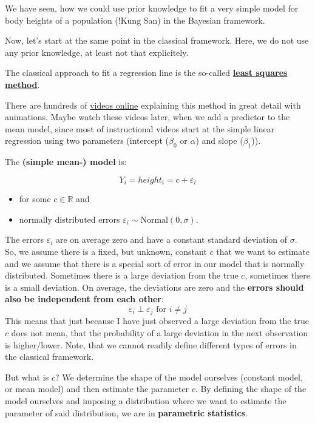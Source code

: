 \documentclass[
]{book}
\providecommand{\tightlist}{%
  \setlength{\itemsep}{0pt}\setlength{\parskip}{0pt}}
\begin{document}
We have seen, how we could use prior knowledge to fit a very simple model
for body heights of a population (!Kung San) in the Bayesian framework.

Now, let's start at the same point in the classical framework.
Here, we do not use any prior knowledge, at least not that explicitely.

The classical approach to fit a regression line is the so-called
\textbf{\href{https://en.wikipedia.org/wiki/Least_squares}{least squares method}}.

There are hundreds of \href{https://www.youtube.com/results?search_query=linear+regression}{videos online}
explaining this method in great detail
with animations. Maybe watch these videos later, when we add a predictor to the mean model,
since most of instructional videos start at the simple linear regression using
two parameters (intercept (\(\beta_0\) or \(\alpha\)) and slope (\(\beta_1\))).

The \textbf{(simple mean-) model} is:

\[ Y_i = height_i = c + \varepsilon_i \]

\begin{itemize}
\tightlist
\item
  for some \(c \in \mathbb{R}\) and
\item
  normally distributed errors \(\varepsilon_i \sim \text{Normal}(0, \sigma)\).
\end{itemize}

The errors \(\varepsilon_i\) are on average zero and have a constant standard deviation of \(\sigma\).
So, we assume there is a fixed, but unknown, constant \(c\) that we want to estimate and we
assume that there is a special sort of error in our model that is normally distributed.
Sometimes there is a large deviation from the true \(c\), sometimes there is a small deviation.
On average, the deviations are zero and the \textbf{errors should also be independent from each other}:
\[ \varepsilon_i \perp \varepsilon_j \text{ for } i \neq j\]
This means that just because I have just observed a large deviation from the true \(c\)
does not mean, that the probability of a large deviation in the next observation is higher/lower.
Note, that we cannot readily define different types of errors in the classical framework.

But what is \(c\)? We determine the shape of the model
ourselves (constant model, or mean model) and then estimate the parameter \(c\).
By defining the shape of the model ourselves and imposing a distribution where we want to
estimate the parameter of said distribution, we are in \textbf{parametric statistics}.
\end{document}
